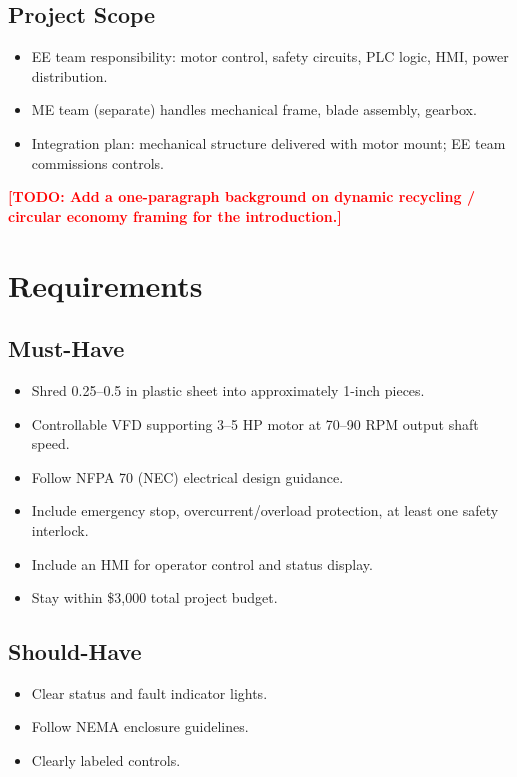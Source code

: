 \documentclass[hidelinks,12pt]{article}
\newcommand{\todo}[1]{\textcolor{red}{\textbf{[TODO: #1]}}}
\begin{document}
\subsection{Project Scope}
\begin{itemize}
    \item EE team responsibility: motor control, safety circuits, PLC logic, HMI, power distribution.
    \item ME team (separate) handles mechanical frame, blade assembly, gearbox.
    \item Integration plan: mechanical structure delivered with motor mount; EE team commissions controls.
\end{itemize}

\todo{Add a one-paragraph background on dynamic recycling / circular economy framing for the introduction.}

\section{Requirements}

\subsection{Must-Have}
\begin{itemize}
    \item Shred 0.25--0.5 in plastic sheet into approximately 1-inch pieces.
    \item Controllable VFD supporting 3--5 HP motor at 70--90 RPM output shaft speed.
    \item Follow NFPA 70 (NEC) electrical design guidance.
    \item Include emergency stop, overcurrent/overload protection, at least one safety interlock.
    \item Include an HMI for operator control and status display.
    \item Stay within \$3,000 total project budget.
\end{itemize}

\subsection{Should-Have}
\begin{itemize}
    \item Clear status and fault indicator lights.
    \item Follow NEMA enclosure guidelines.
    \item Clearly labeled controls.
\end{itemize}
\end{document}
